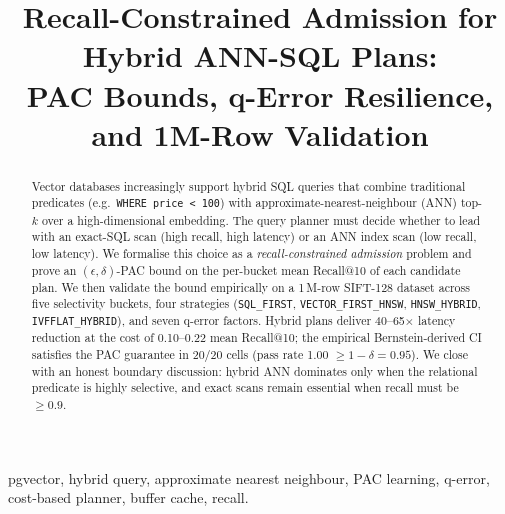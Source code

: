 \documentclass[conference]{IEEEtran}
\begin{document}
\title{Recall-Constrained Admission for Hybrid ANN-SQL Plans: \\
       PAC Bounds, q-Error Resilience, and 1M-Row Validation}

\author{
\and
{}
}

\maketitle

\begin{abstract}
Vector databases increasingly support hybrid SQL queries that combine
traditional predicates (e.g.\ \texttt{WHERE price < 100}) with
approximate-nearest-neighbour (ANN) top-$k$ over a high-dimensional
embedding.  The query planner must decide whether to lead with an
exact-SQL scan (high recall, high latency) or an ANN index scan (low
recall, low latency).  We formalise this choice as a
\emph{recall-constrained admission} problem and prove an
$(\epsilon,\delta)$-PAC bound on the per-bucket mean Recall@10 of
each candidate plan.  We then validate the bound empirically on a
1\,M-row SIFT-128 dataset across five selectivity buckets, four
strategies (\texttt{SQL\_FIRST}, \texttt{VECTOR\_FIRST\_HNSW},
\texttt{HNSW\_HYBRID}, \texttt{IVFFLAT\_HYBRID}), and seven
q-error factors.  Hybrid plans deliver 40--65$\times$ latency
reduction at the cost of 0.10--0.22 mean Recall@10; the empirical
Bernstein-derived CI satisfies the PAC guarantee in 20/20 cells
(pass rate 1.00 $\geq 1-\delta = 0.95$).  We close with an honest
boundary discussion: hybrid ANN dominates only when the relational
predicate is highly selective, and exact scans remain essential when
recall must be $\geq 0.9$.
\end{abstract}

\begin{IEEEkeywords}
pgvector, hybrid query, approximate nearest neighbour,
PAC learning, q-error, cost-based planner, buffer cache, recall.
\end{IEEEkeywords}
\end{document}
